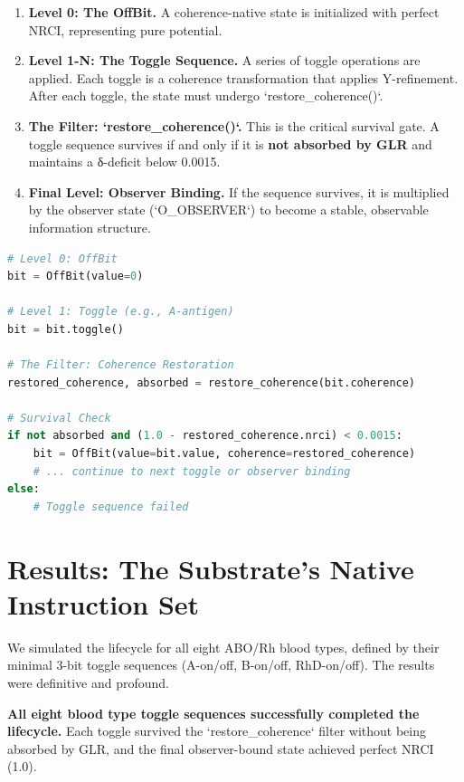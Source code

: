 \documentclass[11pt]{article}
\begin{document}
\begin{enumerate}
    \item \textbf{Level 0: The OffBit.} A coherence-native state is initialized with perfect NRCI, representing pure potential.
    \item \textbf{Level 1-N: The Toggle Sequence.} A series of toggle operations are applied. Each toggle is a coherence transformation that applies Y-refinement. After each toggle, the state must undergo `restore_coherence()`.
    \item \textbf{The Filter: `restore_coherence()`.} This is the critical survival gate. A toggle sequence survives if and only if it is \textbf{not absorbed by GLR} and maintains a δ-deficit below 0.0015.
    \item \textbf{Final Level: Observer Binding.} If the sequence survives, it is multiplied by the observer state (`O_OBSERVER`) to become a stable, observable information structure.
\end{enumerate}

\begin{lstlisting}[language=Python, caption={The core logic of the `bit_to_blood.py` simulation, showing the toggle-and-restore cycle.}]
# Level 0: OffBit
bit = OffBit(value=0)

# Level 1: Toggle (e.g., A-antigen)
bit = bit.toggle()

# The Filter: Coherence Restoration
restored_coherence, absorbed = restore_coherence(bit.coherence)

# Survival Check
if not absorbed and (1.0 - restored_coherence.nrci) < 0.0015:
    bit = OffBit(value=bit.value, coherence=restored_coherence)
    # ... continue to next toggle or observer binding
else:
    # Toggle sequence failed
\end{lstlisting}

\section{Results: The Substrate's Native Instruction Set}

We simulated the lifecycle for all eight ABO/Rh blood types, defined by their minimal 3-bit toggle sequences (A-on/off, B-on/off, RhD-on/off). The results were definitive and profound.

\textbf{All eight blood type toggle sequences successfully completed the lifecycle.} Each toggle survived the `restore_coherence` filter without being absorbed by GLR, and the final observer-bound state achieved perfect NRCI (1.0).
\end{document}
